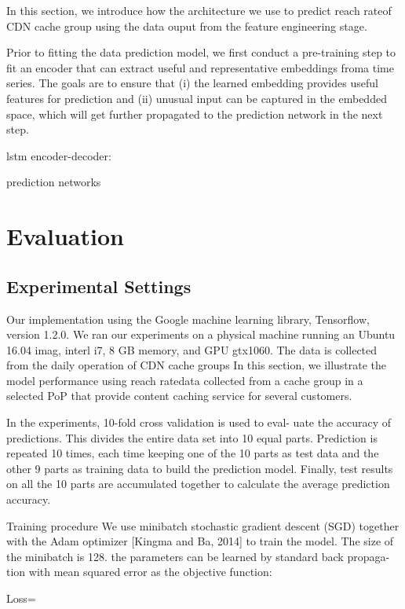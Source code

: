 \documentclass[5p]{elsarticle}
\newcommand{\dabiaolv}{reach rate}
\begin{document}
In this section, we introduce how the architecture we use to predict \dabiaolv of CDN cache group using the data ouput from the feature engineering stage. 

Prior to fitting the data prediction model, we first conduct a pre-training step to fit an encoder that can extract useful and representative embeddings froma  time  series.  The  goals  are  to  ensure  that  (i)  the  learned embedding  provides  useful  features  for  prediction  and  (ii) unusual input can be captured in the embedded space, which will get further propagated to the prediction network in the next step.


lstm encoder-decoder:

prediction networks

\section{Evaluation}
\subsection{Experimental Settings}
Our implementation using the Google machine learning library, Tensorflow, version 1.2.0. We ran our experiments on a physical machine running an Ubuntu 16.04 imag, interl i7, 8 GB memory, and GPU gtx1060.
The data is collected from the daily operation of CDN cache groups
In this section, we illustrate the model performance using \dabiaolv data collected from a cache group in a selected PoP that provide content caching service for several customers. 

In the experiments, 10-fold cross validation is used to eval-
uate the accuracy of predictions. This divides the entire data
set into 10 equal parts.  Prediction is repeated 10 times, each
time keeping one of the 10 parts as test data and the other 9
parts as training data to build the prediction model. Finally,
test results on all the 10 parts are accumulated together to
calculate the average prediction accuracy.

Training procedure We use minibatch stochastic gradient descent (SGD) together with the Adam optimizer [Kingma and Ba, 2014] to train the model. The size of the minibatch is 128. the parameters can be learned by standard back propaga- tion with mean squared error as the objective function:

Loss={}
\end{document}
